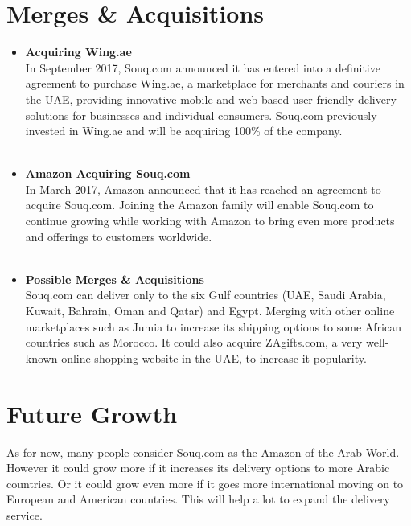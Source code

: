 \documentclass{book}
\begin{document}
\section{Merges \& Acquisitions}
\begin{itemize}

\item \textbf{Acquiring Wing.ae}
	  \\ In September 2017, Souq.com announced it has entered into a definitive agreement to purchase Wing.ae, a marketplace for merchants and couriers in the UAE, providing innovative mobile and web-based user-friendly delivery solutions for businesses and individual consumers. Souq.com previously invested in Wing.ae and will be acquiring 100\% of the company.\\\\


\item \textbf{Amazon Acquiring Souq.com}
	  \\ In March 2017,  Amazon announced that it has reached an agreement to acquire Souq.com. Joining the Amazon family will enable Souq.com to continue growing while working with Amazon to bring even more products and offerings to customers worldwide.\\\\


\item \textbf{Possible Merges \& Acquisitions\\}
Souq.com can deliver only to the six Gulf countries (UAE, Saudi Arabia, Kuwait, Bahrain, Oman and Qatar) and Egypt. Merging with other online marketplaces such as Jumia to increase its shipping options to some African countries such as Morocco. It could also acquire ZAgifts.com, a very well-known  online shopping website in the UAE, to increase it popularity.

\end{itemize}



\section{Future Growth}
As for now, many people consider Souq.com as the Amazon of the Arab World. However it could grow more if it increases its delivery options to more Arabic countries. Or it could grow even more if it goes more international moving on to European and American countries. This will help a lot to expand the delivery service.\\
\end{document}
